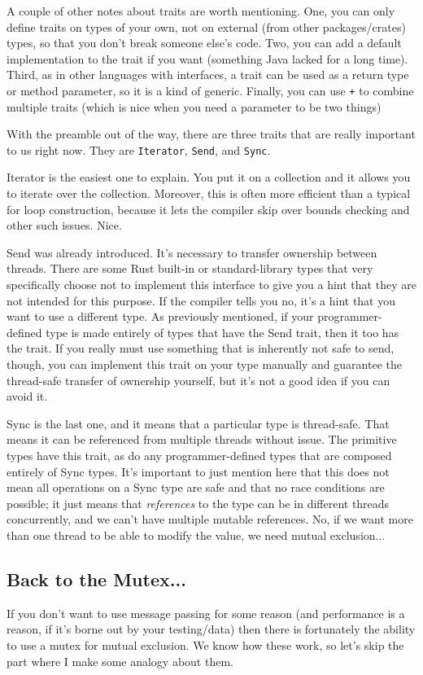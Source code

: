 A couple of other notes about traits are worth mentioning. One, you can only define traits on types of your own, not on external (from other packages/crates) types, so that you don't break someone else's code. Two, you can add a default implementation to the trait if you want (something Java lacked for a long time). Third, as in other languages with interfaces, a trait can be used as a return type or method parameter, so it is a kind of generic. Finally, you can use \texttt{+} to combine multiple traits (which is nice when you need a parameter to be two things)

With the preamble out of the way, there are three traits that are really important to us right now. They are \texttt{Iterator}, \texttt{Send}, and \texttt{Sync}. 

Iterator is the easiest one to explain. You put it on a collection and it allows you to iterate over the collection. Moreover, this is often more efficient than a typical for loop construction, because it lets the compiler skip over bounds checking and other such issues. Nice.

Send was already introduced. It's necessary to transfer ownership between threads. There are some Rust built-in or standard-library types that very specifically choose not to implement this interface to give you a hint that they are not intended for this purpose. If the compiler tells you no, it's a hint that you want to use a different type. As previously mentioned, if your programmer-defined type is made entirely of types that have the Send trait, then it too has the trait. If you really must use something that is inherently not safe to send, though, you can implement this trait on your type manually and guarantee the thread-safe transfer of ownership yourself, but it's not a good idea if you can avoid it.

Sync is the last one, and it means that a particular type is thread-safe. That means it can be referenced from multiple threads without issue. The primitive types have this trait, as do any programmer-defined types that are composed entirely of Sync types. It's important to just mention here that this does not mean all operations on a Sync type are safe and that no race conditions are possible; it just means that \textit{references} to the type can be in different threads concurrently, and we can't have multiple mutable references. No, if we want more than one thread to be able to modify the value, we need mutual exclusion...

\subsection*{Back to the Mutex...}
If you don't want to use message passing for some reason (and performance is a reason, if it's borne out by your testing/data) then there is fortunately the ability to use a mutex for mutual exclusion. We know how these work, so let's skip the part where I make some analogy about them. 

